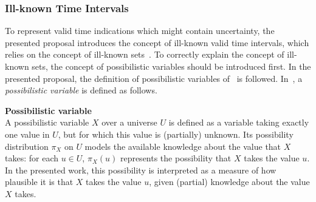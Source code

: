 

\subsubsection{Ill-known Time Intervals}
\label{subsec:representation-time-intervals}


To represent valid time indications which might contain uncertainty, the presented proposal introduces the concept of ill-known valid time intervals, which relies on the concept of ill-known sets~\cite{Dubois88b}. To correctly explain the concept of ill-known sets, the concept of possibilistic variables should be introduced first. In the presented proposal, the definition of possibilistic variables of~\cite{Pon11} is followed. In~\cite{Pon11}, a \emph{possibilistic variable} is defined as follows.


\begin{svgraybox}
\vspace{-10pt}
\begin{definition}
\textbf{Possibilistic variable}~\cite{Pon11}\\
A possibilistic variable $X$ over a universe $U$ is defined as a variable taking exactly one value in $U$, but for which this value is (partially) unknown. Its possibility distribution $\pi_X$ on $U$ models the available knowledge about the value that $X$ takes: for each $u\in U$, $\pi_X(u)$ represents the possibility that $X$ takes the value $u$. In the presented work, this possibility is interpreted as a measure of how plausible it is that $X$ takes the value $u$, given (partial) knowledge about the value $X$ takes.
\end{definition}
\vspace{-10pt}
\end{svgraybox}


